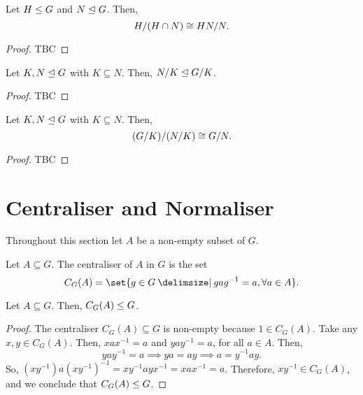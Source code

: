 \documentclass[11pt]{penrose}
\begin{document}
\begin{nthm}
    Let $H \mathrel{\leq} G$ and $N \mathrel{\trianglelefteq} G$. Then,
    \begin{equation*}
        H / (H \cap N) \mathrel{\cong} HN / N.
    \end{equation*}
\end{nthm}
\begin{proof}
    TBC
\end{proof}

\begin{nlemma}
    Let $K, N \mathrel{\trianglelefteq} G$ with $K \subseteq N$. Then, $N/K \mathrel{\trianglelefteq} G/K$.
\end{nlemma}
\begin{proof}
    TBC
\end{proof}

\begin{nthm}
    Let $K, N \mathrel{\trianglelefteq} G$ with $K \subseteq N$. Then,
    \begin{equation*}
        (G/K) / (N/K) \mathrel{\cong} G/N.
    \end{equation*}
\end{nthm}
\begin{proof}
    TBC
\end{proof}

\section{Centraliser and Normaliser}

Throughout this section let $A$ be a non-empty subset of $G$.

\begin{ndfn}
    Let $A \subseteq G$. The centraliser of $A$ in $G$ is the set
    \begin{equation*}
        C_{G}(A) = \set{ g \in G \st g a g^{-1} = a, \forall a \in A }.
    \end{equation*}
\end{ndfn}

\begin{nthm}
    Let $A \subseteq G$. Then, $C_{G}(A) \mathrel{\leq} G$.
\end{nthm}
\begin{proof}
    The centraliser $C_{G}(A) \subseteq G$ is non-empty because $1 \in C_{G}(A)$. Take any $x, y \in C_{G}(A)$. Then, $xax^{-1} = a$ and $yay^{-1} = a$, for all $a \in A$. Then,
    \begin{equation*}
        yay^{-1} = a
        \implies
        ya = ay
        \implies
        a = y^{-1}ay.
    \end{equation*}
    So, $(xy^{-1}) a (xy^{-1})^{-1} = x y^{-1} a y x^{-1} = x a x^{-1} = a$. Therefore, $xy^{-1} \in C_{G}(A)$, and we conclude that $C_{G}(A) \mathrel{\leq} G$.
\end{proof}
\end{document}
